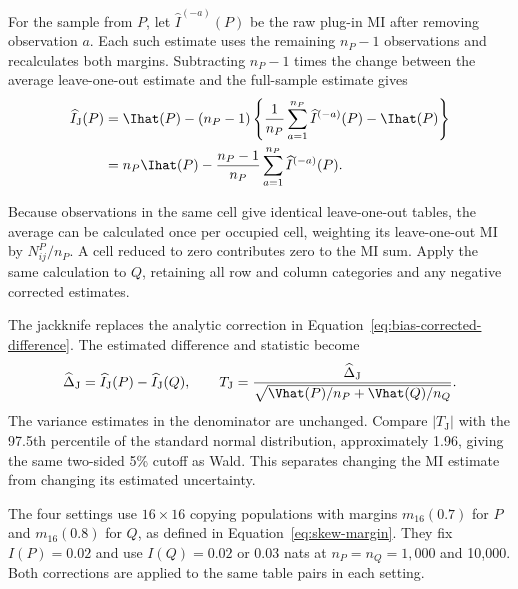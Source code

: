 \begin{samepage}
For the sample from \(P\), let
\(\widehat I^{(-a)}(P)\) be the raw plug-in MI after removing observation
\(a\). Each such estimate uses the remaining \(n_P-1\) observations and
recalculates both margins. Subtracting \(n_P-1\) times the change between
the average leave-one-out estimate and the full-sample estimate gives
\begin{align}
 \widehat I_{\mathrm J}(P)
 &=\Ihat(P)-(n_P-1)
 \left\{\frac{1}{n_P}\sum_{a=1}^{n_P}\widehat I^{(-a)}(P)-\Ihat(P)\right\}
 \notag\\
 &=n_P\Ihat(P)-\frac{n_P-1}{n_P}
 \sum_{a=1}^{n_P}\widehat I^{(-a)}(P).
 \label{eq:jackknife-mi-check}
\end{align}
\end{samepage}
Because observations in the same cell give identical leave-one-out tables,
the average can be calculated once per occupied cell, weighting its
leave-one-out MI by \(N^P_{ij}/n_P\). A cell reduced to zero contributes
zero to the MI sum. Apply the same calculation to \(Q\), retaining
all row and column categories and any negative corrected estimates.

The jackknife replaces the analytic correction in
Equation~\eqref{eq:bias-corrected-difference}. The estimated difference
and statistic become
\begin{equation}
 \widehat\Delta_{\mathrm J}
 =\widehat I_{\mathrm J}(P)-\widehat I_{\mathrm J}(Q),
 \qquad
 T_{\mathrm J}
 =\frac{\widehat\Delta_{\mathrm J}}
 {\sqrt{\Vhat(P)/n_P+\Vhat(Q)/n_Q}}.
 \label{eq:jackknife-fixed-se-check}
\end{equation}
The variance estimates in the denominator are unchanged. Compare
\(|T_{\mathrm J}|\) with the 97.5th percentile of the standard normal
distribution, approximately 1.96, giving the same two-sided 5\% cutoff
as Wald. This separates changing the MI estimate from changing its
estimated uncertainty.

The four settings use \(16\times16\) copying populations with margins
\(m_{16}(0.7)\) for \(P\) and \(m_{16}(0.8)\) for \(Q\), as defined
in Equation~\eqref{eq:skew-margin}. They fix \(I(P)=0.02\) and use
\(I(Q)=0.02\) or 0.03 nats at \(n_P=n_Q=1{,}000\) and 10,000.
Both corrections are applied to the same table pairs in each setting.

\begin{table}[H]
\centering
\small
\caption{Analytic and jackknife MI differences with the same standard error.}
\label{tab:jackknife-difference-check}

\end{table}


